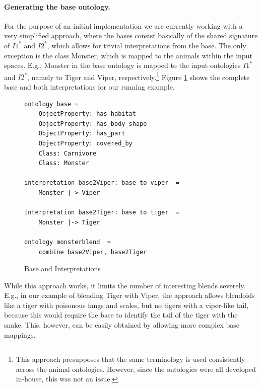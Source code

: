 \documentclass[letterpaper]{article}
\begin{document}
\paragraph{Generating the base ontology.}
For the purpose of an initial implementation we are currently working with a very
 simplified approach, where the bases consist basically of the shared signature
  of $I1^*$ and $I2^*$, which allows for trivial interpretations from the base.  
  The only exception is the class Monster, which is mapped to the animals within
   the input spaces. E.g., Monster in the base ontology is mapped to the input ontologies $I1^*$ and $I2^*$, namely to Tiger and  Viper, respectively.\footnote{This approach presupposes that the 
   same terminology is used consistently across the animal ontologies. However, since
  the ontologies were all developed in-house, this was not an issue.} Figure \ref{base} shows the complete base and both interpretations for our running example.
 \begin{figure}[htbp]
\begin{lstlisting}[basicstyle=\ttfamily\scriptsize,language=dolText,morekeywords={props,excluding,ObjectProperty,Class,DisjointUnionOf,SubClassOf,Characteristics,Transitive,Asymmetric,SubPropertyOf,DisjointClasses,EquivalentTo,Asymmetric,inverse,only,forall,iff,if,or,exists,bridge,distributed},escapechar=@,mathescape,alsolanguage=owl2Manchester]
ontology base = 
	ObjectProperty: has_habitat
	ObjectProperty: has_body_shape
	ObjectProperty: has_part 
	ObjectProperty: covered_by 
	Class: Carnivore	
	Class: Monster

interpretation base2Viper: base to viper  =
	Monster |-> Viper

interpretation base2Tiger: base to tiger  =
	Monster |-> Tiger

ontology monsterblend  = 
    combine base2Viper, base2Tiger

\end{lstlisting}
\caption{Base and Interpretations}
\label{base}
\end{figure}
\vspace{-2em}


  
  While
  this approach works, it limits the number of interesting blends severely. E.g.,
  in our example of blending  Tiger with  Viper, the approach allows blendoids
 like a tiger with poisonous fangs and scales, but no tigers with a viper-like tail, 
 because this would require the base to identify the tail of the tiger with the snake. 
 This, however, can be easily obtained by allowing more complex base mappings.   
\end{document}
